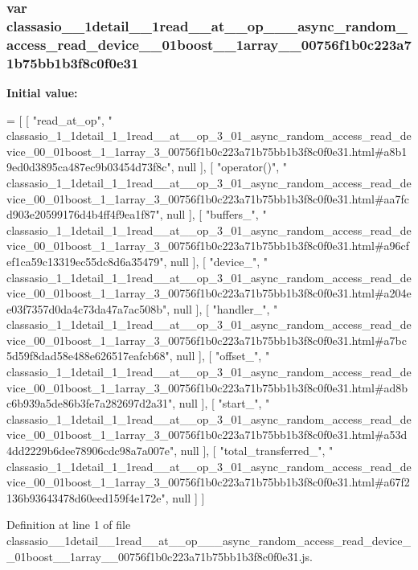 \subsubsection[{classasio\+\_\+1\+\_\+1detail\+\_\+1\+\_\+1read\+\_\+\+\_\+at\+\_\+\+\_\+op\+\_\+3\+\_\+01\+\_\+async\+\_\+random\+\_\+access\+\_\+read\+\_\+device\+\_\+00\+\_\+01boost\+\_\+1\+\_\+1array\+\_\+3\+\_\+00756f1b0c223a71b75bb1b3f8c0f0e31}]{\setlength{\rightskip}{0pt plus 5cm}var classasio\+\_\+\_\+1detail\+\_\+\_\+1read\+\_\+\+\_\+at\+\_\+\+\_\+op\+\_\+\_\+\_\+async\+\_\+random\+\_\+access\+\_\+read\+\_\+device\+\_\+\_\+01boost\+\_\+\_\+1array\+\_\+\_\+00756f1b0c223a71b75bb1b3f8c0f0e31}\label{classasio__1__1detail__1__1read____at____op__3__01__async__random__access__read__device__00__01b8936dbab3a49971d5cd61a62ec5be1bc_a9af607b230ec06f1a960570e15205c97}
{\bfseries Initial value\+:}
\begin{DoxyCode}
=
[
    [ \textcolor{stringliteral}{"read\_at\_op"}, \textcolor{stringliteral}{"
      classasio\_1\_1detail\_1\_1read\_\_at\_\_op\_3\_01\_async\_random\_access\_read\_device\_00\_01boost\_1\_1array\_3\_00756f1b0c223a71b75bb1b3f8c0f0e31.html#a8b19ed0d3895ca487ec9b03454d73f8c"}, null ],
    [ \textcolor{stringliteral}{"operator()"}, \textcolor{stringliteral}{"
      classasio\_1\_1detail\_1\_1read\_\_at\_\_op\_3\_01\_async\_random\_access\_read\_device\_00\_01boost\_1\_1array\_3\_00756f1b0c223a71b75bb1b3f8c0f0e31.html#aa7fcd903e20599176d4b4ff4f9ea1f87"}, null ],
    [ \textcolor{stringliteral}{"buffers\_"}, \textcolor{stringliteral}{"
      classasio\_1\_1detail\_1\_1read\_\_at\_\_op\_3\_01\_async\_random\_access\_read\_device\_00\_01boost\_1\_1array\_3\_00756f1b0c223a71b75bb1b3f8c0f0e31.html#a96cfef1ca59c13319ec55dc8d6a35479"}, null ],
    [ \textcolor{stringliteral}{"device\_"}, \textcolor{stringliteral}{"
      classasio\_1\_1detail\_1\_1read\_\_at\_\_op\_3\_01\_async\_random\_access\_read\_device\_00\_01boost\_1\_1array\_3\_00756f1b0c223a71b75bb1b3f8c0f0e31.html#a204ee03f7357d0da4c73da47a7ac508b"}, null ],
    [ \textcolor{stringliteral}{"handler\_"}, \textcolor{stringliteral}{"
      classasio\_1\_1detail\_1\_1read\_\_at\_\_op\_3\_01\_async\_random\_access\_read\_device\_00\_01boost\_1\_1array\_3\_00756f1b0c223a71b75bb1b3f8c0f0e31.html#a7bc5d59f8dad58e488e626517eafcb68"}, null ],
    [ \textcolor{stringliteral}{"offset\_"}, \textcolor{stringliteral}{"
      classasio\_1\_1detail\_1\_1read\_\_at\_\_op\_3\_01\_async\_random\_access\_read\_device\_00\_01boost\_1\_1array\_3\_00756f1b0c223a71b75bb1b3f8c0f0e31.html#ad8bc6b939a5de86b3fe7a282697d2a31"}, null ],
    [ \textcolor{stringliteral}{"start\_"}, \textcolor{stringliteral}{"
      classasio\_1\_1detail\_1\_1read\_\_at\_\_op\_3\_01\_async\_random\_access\_read\_device\_00\_01boost\_1\_1array\_3\_00756f1b0c223a71b75bb1b3f8c0f0e31.html#a53d4dd2229b6dee78906cdc98a7a007e"}, null ],
    [ \textcolor{stringliteral}{"total\_transferred\_"}, \textcolor{stringliteral}{"
      classasio\_1\_1detail\_1\_1read\_\_at\_\_op\_3\_01\_async\_random\_access\_read\_device\_00\_01boost\_1\_1array\_3\_00756f1b0c223a71b75bb1b3f8c0f0e31.html#a67f2136b93643478d60eed159f4e172e"}, null ]
]
\end{DoxyCode}


Definition at line 1 of file classasio\+\_\+\_\+1detail\+\_\+\_\+1read\+\_\+\+\_\+at\+\_\+\+\_\+op\+\_\+\_\+\_\+async\+\_\+random\+\_\+access\+\_\+read\+\_\+device\+\_\+\_\+01boost\+\_\+\_\+1array\+\_\+\_\+00756f1b0c223a71b75bb1b3f8c0f0e31.\+js.

